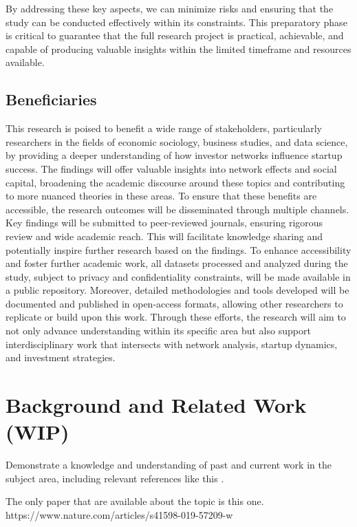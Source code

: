 \documentclass[a4paper,11pt]{article}
\begin{document}
By addressing these key aspects, we can minimize risks and ensuring that the study can be conducted effectively within its constraints. This preparatory phase is critical to guarantee that the full research project is practical, achievable, and capable of producing valuable insights within the limited timeframe and resources available.

\subsection{Beneficiaries}

This research is poised to benefit a wide range of stakeholders, particularly researchers in the fields of economic sociology, business studies, and data science, by providing a deeper understanding of how investor networks influence startup success. The findings will offer valuable insights into network effects and social capital, broadening the academic discourse around these topics and contributing to more nuanced theories in these areas. To ensure that these benefits are accessible, the research outcomes will be disseminated through multiple channels. Key findings will be submitted to peer-reviewed journals, ensuring rigorous review and wide academic reach. This will facilitate knowledge sharing and potentially inspire further research based on the findings. To enhance accessibility and foster further academic work, all datasets processed and analyzed during the study, subject to privacy and confidentiality constraints, will be made available in a public repository. Moreover, detailed methodologies and tools developed will be documented and published in open-access formats, allowing other researchers to replicate or build upon this work. Through these efforts, the research will aim to not only advance understanding within its specific area but also support interdisciplinary work that intersects with network analysis, startup dynamics, and investment strategies.

\section{Background and Related Work (WIP)}

Demonstrate a knowledge and understanding of past and current work in the subject area, including relevant references like this \cite{template}.

The only paper that are available about the topic is this one. https://www.nature.com/articles/s41598-019-57209-w
\end{document}
